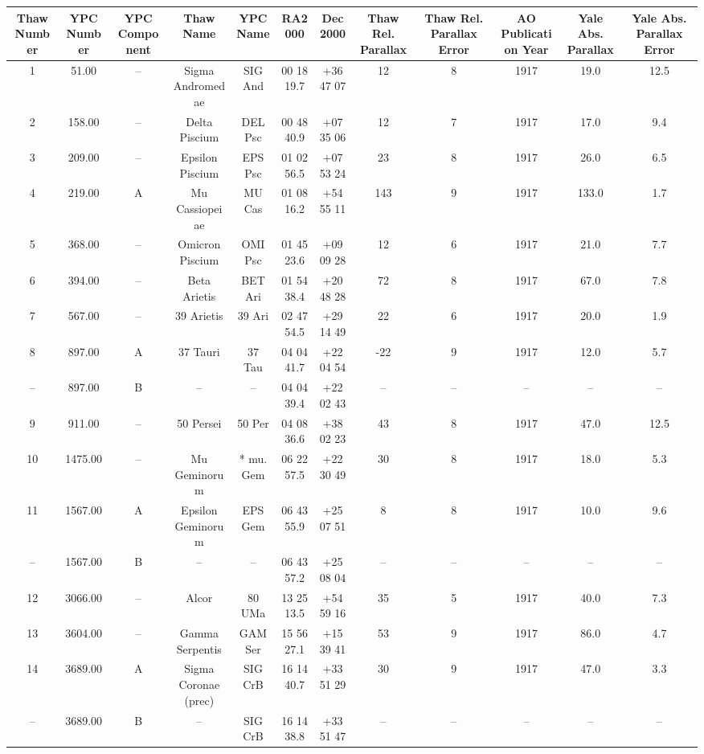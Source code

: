\begin{table}
\begin{tabular}{cccccccccccc}
\hline \hline
Thaw Number & YPC Number & YPC Component & Thaw Name & YPC Name & RA2000 & Dec2000 & Thaw Rel. Parallax & Thaw Rel. Parallax Error & AO Publication Year & Yale Abs. Parallax & Yale Abs. Parallax Error \\
\hline
1 & 51.00 & -- & Sigma Andromedae & SIG And & 00 18 19.7 & +36 47 07 & 12 & 8 & 1917 & 19.0 & 12.5 \\
2 & 158.00 & -- & Delta Piscium & DEL Psc & 00 48 40.9 & +07 35 06 & 12 & 7 & 1917 & 17.0 & 9.4 \\
3 & 209.00 & -- & Epsilon Piscium & EPS Psc & 01 02 56.5 & +07 53 24 & 23 & 8 & 1917 & 26.0 & 6.5 \\
4 & 219.00 & A & Mu Cassiopeiae & MU Cas & 01 08 16.2 & +54 55 11 & 143 & 9 & 1917 & 133.0 & 1.7 \\
5 & 368.00 & -- & Omicron  Piscium & OMI Psc & 01 45 23.6 & +09 09 28 & 12 & 6 & 1917 & 21.0 & 7.7 \\
6 & 394.00 & -- & Beta Arietis & BET Ari & 01 54 38.4 & +20 48 28 & 72 & 8 & 1917 & 67.0 & 7.8 \\
7 & 567.00 & -- & 39 Arietis & 39 Ari & 02 47 54.5 & +29 14 49 & 22 & 6 & 1917 & 20.0 & 1.9 \\
8 & 897.00 & A & 37 Tauri & 37 Tau & 04 04 41.7 & +22 04 54 & -22 & 9 & 1917 & 12.0 & 5.7 \\
-- & 897.00 & B & -- & -- & 04 04 39.4 & +22 02 43 & -- & -- & -- & -- & -- \\
9 & 911.00 & -- & 50 Persei & 50 Per & 04 08 36.6 & +38 02 23 & 43 & 8 & 1917 & 47.0 & 12.5 \\
10 & 1475.00 & -- & Mu Geminorum & * mu. Gem & 06 22 57.5 & +22 30 49 & 30 & 8 & 1917 & 18.0 & 5.3 \\
11 & 1567.00 & A & Epsilon Geminorum & EPS Gem & 06 43 55.9 & +25 07 51 & 8 & 8 & 1917 & 10.0 & 9.6 \\
-- & 1567.00 & B & -- & -- & 06 43 57.2 & +25 08 04 & -- & -- & -- & -- & -- \\
12 & 3066.00 & -- & Alcor & 80 UMa & 13 25 13.5 & +54 59 16 & 35 & 5 & 1917 & 40.0 & 7.3 \\
13 & 3604.00 & -- & Gamma Serpentis & GAM Ser & 15 56 27.1 & +15 39 41 & 53 & 9 & 1917 & 86.0 & 4.7 \\
14 & 3689.00 & A & Sigma Coronae (prec) & SIG CrB & 16 14 40.7 & +33 51 29 & 30 & 9 & 1917 & 47.0 & 3.3 \\
-- & 3689.00 & B & -- & SIG CrB & 16 14 38.8 & +33 51 47 & -- & -- & -- & -- & -- \\

\end{tabular}
\end{table}
